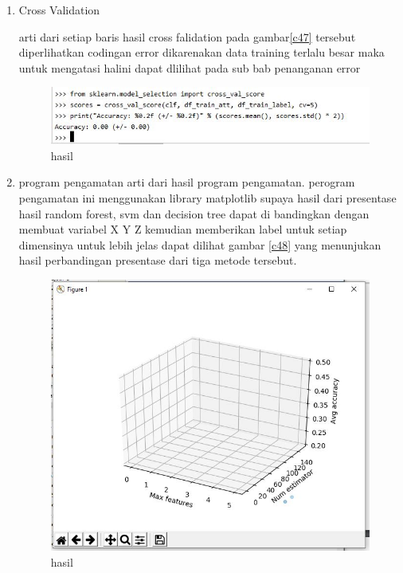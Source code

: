 \begin{enumerate}
\item Cross Validation\par
arti dari setiap baris hasil cross falidation pada gambar\ref{c47} tersebut diperlihatkan codingan error dikarenakan data training terlalu besar maka untuk mengatasi halini dapat dlilihat pada sub bab penanganan error 

\begin{figure}[ht]
\centering
\includegraphics[scale=0.5]{figures/1174042/chapter3/2,7.JPG}
\caption{hasil}
\label{contoh}
\end{figure}

\item program pengamatan
arti dari hasil program pengamatan. perogram pengamatan ini menggunakan library matplotlib supaya hasil dari presentase hasil random forest, svm dan decision tree dapat di bandingkan dengan membuat variabel X Y Z kemudian memberikan label untuk setiap dimensinya untuk lebih jelas dapat dilihat gambar \ref{c48} yang menunjukan hasil perbandingan presentase dari tiga metode tersebut. 

\begin{figure}[ht]
\centering
\includegraphics[scale=0.5]{figures/1174042/chapter3/2,8.JPG}
\caption{hasil}
\label{contoh}
\end{figure}
\end{enumerate}


